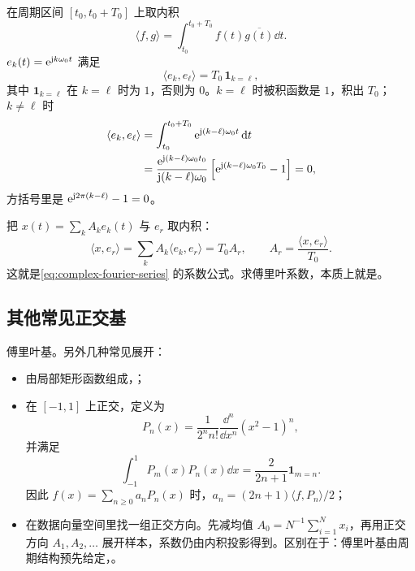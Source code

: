 在周期区间 $[t_0,t_0+T_0]$ 上取内积
\[
  \langle f,g\rangle
  =\int_{t_0}^{t_0+T_0}f(t)\overline{g(t)}\dd t.
\]
 $e_k(t)=\mathrm{e}^{\mathrm{j} k\omega_0t}$ 满足
\begin{equation}
  \langle e_k,e_\ell\rangle
  =T_0\,\mathbf{1}_{k=\ell},
  \label{eq:fourier-exponential-orthogonality}
\end{equation}
其中 $\mathbf{1}_{k=\ell}$ 在 $k=\ell$ 时为 $1$，否则为 $0$。$k=\ell$ 时被积函数是 $1$，积出 $T_0$；$k\ne\ell$ 时
\begin{align*}
  \langle e_k,e_\ell\rangle
  &=\int_{t_0}^{t_0+T_0}\mathrm{e}^{\mathrm{j}(k-\ell)\omega_0t}\mathop{}\!\mathrm{d} t\\
  &=\frac{\mathrm{e}^{\mathrm{j}(k-\ell)\omega_0t_0}}
          {\mathrm{j}(k-\ell)\omega_0}
    \left[\mathrm{e}^{\mathrm{j}(k-\ell)\omega_0T_0}-1\right]=0,
\end{align*}
方括号里是 $\mathrm{e}^{\mathrm{j}2\pi(k-\ell)}-1=0$。

把 $x(t)=\sum_kA_ke_k(t)$ 与 $e_r$ 取内积：
\[
  \langle x,e_r\rangle=\sum_k A_k\langle e_k,e_r\rangle=T_0A_r,
  \qquad
  A_r=\frac{\langle x,e_r\rangle}{T_0}.
\]
这就是\cref{eq:complex-fourier-series} 的系数公式。求傅里叶系数，本质上就是。

\subsection{其他常见正交基}

傅里叶基。另外几种常见展开：
\begin{itemize}
  \item {}由局部矩形函数组成，；
  \item {}在 $[-1,1]$ 上正交，定义为
  \begin{equation}
    P_n(x)=\frac{1}{2^n n!}\frac{\dd^n}{\dd x^n}(x^2-1)^n,
    \label{eq:legendre-polynomial}
  \end{equation}
  并满足
  \begin{equation}
    \int_{-1}^{1}P_m(x)P_n(x)\dd x
    =\frac{2}{2n+1}\mathbf{1}_{m=n}.
    \label{eq:legendre-orthogonality}
  \end{equation}
  因此 $f(x)=\sum_{n\geq0}a_nP_n(x)$ 时，$a_n=(2n+1)\langle f,P_n\rangle/2$；
  \item {}在数据向量空间里找一组正交方向。先减均值 $A_0=N^{-1}\sum_{i=1}^{N}x_i$，再用正交方向 $A_1,A_2,\ldots$ 展开样本，系数仍由内积投影得到。区别在于：傅里叶基由周期结构预先给定，。
\end{itemize}


